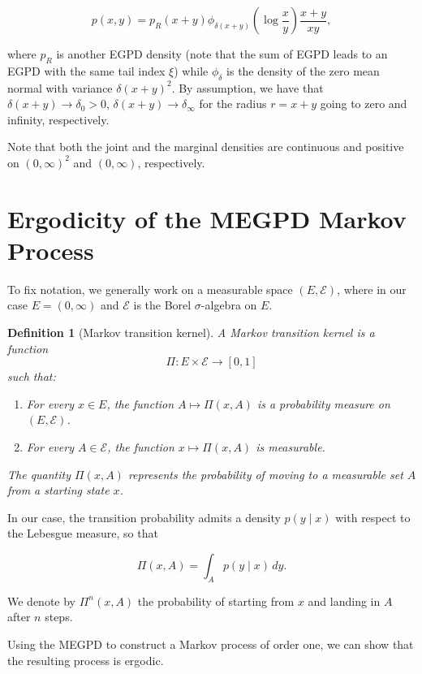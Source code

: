 \documentclass{article}
\newtheorem{definition}{Definition}[section]
\begin{document}
\begin{equation*}
  p(x, y) = p_R(x + y) \phi_{\delta(x+y)}(\log \frac{x}{y}) \frac{x+y}{xy},
\end{equation*}

where $p_R$ is another EGPD density (note that the sum of EGPD leads to an EGPD with the same tail index $\xi$) while $\phi_\delta$ is the density of the zero mean normal with variance $\delta(x+y)^2$. By assumption, we have that $\delta(x+y) \to \delta_0 > 0$, $\delta(x+y) \to \delta_\infty$ for the radius $r = x + y$ going to zero and infinity, respectively.

Note that both the joint and the marginal densities are continuous and positive on $(0, \infty)^2$ and $(0, \infty)$, respectively.

\section{Ergodicity of the MEGPD Markov Process}

To fix notation, we generally work on a measurable space $(E, \mathcal{E})$, where in our case $E = (0, \infty)$ and $\mathcal{E}$ is the Borel $\sigma$-algebra on $E$.

\begin{definition}[Markov transition kernel]
  A Markov transition kernel is a function
  \[
    \Pi : E \times \mathcal{E} \to [0,1]
  \]
  such that:
  \begin{enumerate}
    \item For every $x \in E$, the function $A \mapsto \Pi(x,A)$ is a probability measure on $(E,\mathcal{E})$.
    \item For every $A \in \mathcal{E}$, the function $x \mapsto \Pi(x,A)$ is measurable.
  \end{enumerate}
  The quantity $\Pi(x,A)$ represents the probability of moving to a measurable set $A$ from a starting state $x$.
\end{definition}

In our case, the transition probability admits a density $p(y \mid x)$ with respect to the Lebesgue measure, so that

\[
  \Pi(x,A) = \int_A p(y \mid x)\,dy.
\]

We denote by $\Pi^n(x,A)$ the probability of starting from $x$ and landing in $A$ after $n$ steps.

Using the MEGPD to construct a Markov process of order one, we can show that the resulting process is ergodic.
\end{document}
